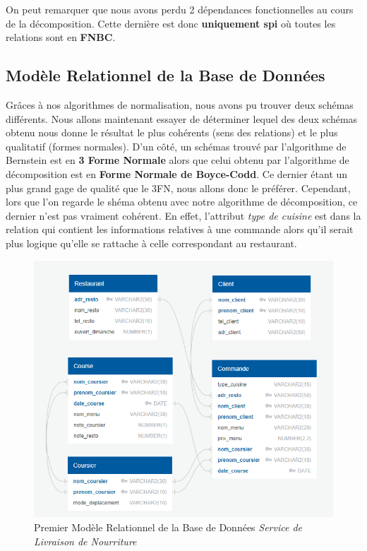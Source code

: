 \documentclass[french]{article}
\begin{document}
            \noindent
            On peut remarquer que nous avons perdu 2 dépendances fonctionnelles au cours de la décomposition. Cette dernière est donc \textbf{uniquement spi} où toutes les relations sont en \textbf{FNBC}.
            
        \subsection*{Modèle Relationnel de la Base de Données}
            Grâces à nos algorithmes de normalisation, nous avons pu trouver deux schémas différents. Nous allons maintenant essayer de déterminer lequel des deux schémas obtenu nous donne le résultat le plus cohérents (sens des relations) et le plus qualitatif (formes normales).\newline
            D'un côté, un schémas trouvé par l'algorithme de Bernstein est en \textbf{3 Forme Normale} alors que celui obtenu par l'algorithme de décomposition est en \textbf{Forme Normale de Boyce-Codd}. Ce dernier étant un plus grand gage de qualité que le 3FN, nous allons donc le préférer.\newline
            Cependant, lors que l'on regarde le shéma obtenu avec notre algorithme de décomposition, ce dernier n'est pas vraiment cohérent. En effet, l'attribut \emph{type de cuisine} est dans la relation qui contient les informations relatives à une commande alors qu'il serait plus logique qu'elle se rattache à celle correspondant au restaurant.\bigskip
 
            \begin{figure}[ht] %
                \centering
                \includegraphics[scale = 0.7]{Image/modele_relationnel_1.png}
                \caption{Premier Modèle Relationnel de la Base de Données \emph{Service de Livraison de Nourriture}}
                \label{image_modele_relationnel_1}
            \end{figure}
            \newpage
\end{document}
